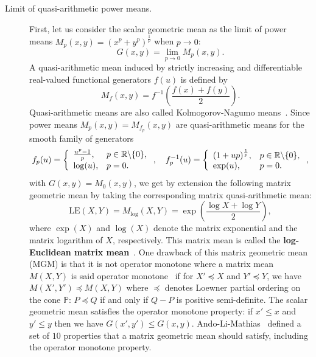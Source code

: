 \documentclass{article}
\def\bbR{\mathbb{R}}
\def\LEM{\mathrm{LE}}
\def\bbP{\mathbb{P}}
\begin{document}
\begin{description}
\item[Limit of quasi-arithmetic power means.] First, let us consider the scalar geometric mean as the limit of power means $M_p(x,y)=\left(x^p+y^p\right)^{\frac{1}{p}}$ when $p\rightarrow 0$:
$$
G(x,y)=\lim_{p\rightarrow 0} M_p(x,y).
$$
A quasi-arithmetic mean induced by strictly increasing and differentiable real-valued functional generators $f(u)$ is defined by
$$
M_f(x,y)=f^{-1}\left(\frac{f(x)+f(y)}{2}\right).
$$
Quasi-arithmetic means are also called Kolmogorov-Nagumo means~\cite{Kolmogorov-1930,Nagumo-1930}. 
Since power means $M_p(x,y)=M_{f_p}(x,y)$ are quasi-arithmetic means for the smooth family of generators
$$
f_p(u)=
\left\{
\begin{array}{ll}
\frac{u^p-1}{p}, & p\in\bbR\backslash\{0\},\cr
\log(u), & p=0.
\end{array}
\right., \quad
f_p^{-1}(u)=
\left\{
\begin{array}{ll}
(1+up)^{\frac{1}{p}}, & p\in\bbR\backslash\{0\},\cr
\exp(u), & p=0.
\end{array}
\right.,
$$
with $G(x,y)=M_0(x,y)$, we get by extension the following matrix geometric mean by taking the corresponding matrix quasi-arithmetic mean:
$$
\LEM(X,Y)=M_{\log}(X,Y)=\exp\left(\frac{\log X+\log Y}{2}\right),
$$
where $\exp(X)$ and $\log(X)$ denote the matrix exponential and  the matrix logarithm of $X$, respectively.
This matrix mean is called the {\bf log-Euclidean matrix mean}~\cite{LEMean-2007}.
One drawback of this matrix geometric mean (MGM) is that it is not operator monotone where
a matrix mean $M(X,Y)$ is said operator monotone~\cite{bhatia2006riemannian} if for $X'\preceq X$ and $Y'\preceq Y$, we have
$M(X',Y')\preceq M(X,Y)$ where $\preceq$ denotes Loewner partial ordering on the cone $\bbP$:
 $P\preceq Q$ if and only if $Q-P$ is positive semi-definite.
The scalar geometric mean satisfies the operator monotone property: if $x'\leq x$ and $y'\leq y$ then we have $G(x',y')\leq G(x,y)$.
Ando-Li-Mathias~\cite{ALM-2004} defined a set of $10$ properties that a matrix geometric mean should satisfy, including the operator monotone property.
	

\end{description}
\end{document}
